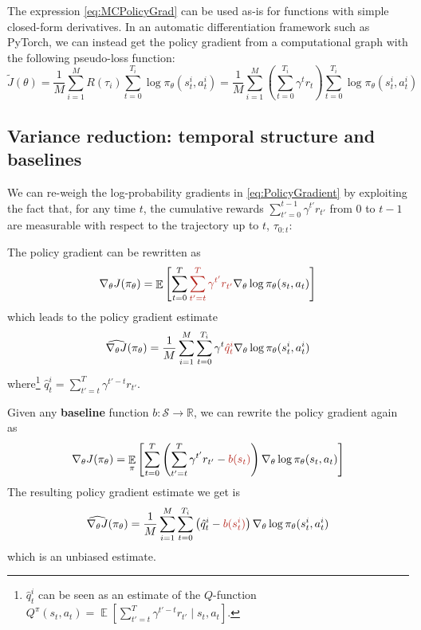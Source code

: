 \documentclass[12pt]{report}
\newcommand\RR{\mathbb{R}}
\DeclareMathOperator{\EE}{\mathbb{E}}
\newcommand{\calS}{\mathcal{S}}
\newcommand{\redfont}{\color{darkred}}
\newcommand{\bluefont}{\color{Blue}}
\begin{document}
\begin{remark}\label{rmk:PolicyGradPseudoLoss} The expression \eqref{eq:MCPolicyGrad} can be used as-is for functions with simple closed-form derivatives.
In an automatic differentiation framework such as {\normalfont\sffamily PyTorch}, we can instead get the policy gradient from a computational graph with the following pseudo-loss function:
\begin{equation}\label{eq:PolicyGradPseudoLoss}
	\tilde{J}(\theta) =
	\frac{1}{M}\sum_{i=1}^M R(\tau_i)
	\sum_{t=0}^{T_i} \log\pi_\theta(s_t^i, a_t^i) =
	\frac{1}{M}\sum_{i=1}^M
	\left(
		\sum_{t=0}^{T_i} \gamma^t r_{t}
	\right)
	\sum_{t=0}^{T_i} \log\pi_\theta(s_t^i, a_t^i)
\end{equation}
\end{remark}


\subsection{Variance reduction: temporal structure and baselines}

We can re-weigh the log-probability gradients in \cref{eq:PolicyGradient} by exploiting the fact that, for any time $t$, the cumulative rewards $\sum_{t'=0}^{t-1} \gamma^{t'} r_{t'}$ from $0$ to $t-1$ are measurable with respect to the trajectory up to $t$, $\tau_{0:t}$:
\begin{prop}
The policy gradient can be rewritten as
\begin{equation}
\nabla_\theta J(\pi_\theta) =
\EE\left[
	\sum_{t=0}^T
	{\redfont
		\sum_{t'=t}^T \gamma^{t'} r_{t'}
	}
	\nabla_\theta \log\pi_\theta(s_t,a_t)
\right]
\end{equation}
which leads to the policy gradient estimate
\begin{equation}
	\widehat{\nabla_\theta J}(\pi_\theta) =
	\frac{1}{M}\sum_{i=1}^M
	\sum_{t=0}^{T_i} \gamma^t
	{\redfont\hat{q}^i_t}
	\nabla_\theta \log\pi_\theta (s_t^i, a_t^i)
\end{equation}
where\footnote{$\hat{q}^i_t$ can be seen as an estimate of the $Q$-function $Q^\pi(s_t, a_t) = \EE[\sum_{t'=t}^T \gamma^{t'-t} r_{t'} \mid s_{t}, a_{t} ]$.} $\hat{q}^i_t = \sum_{t'=t}^T \gamma^{t'-t}r_{t'}$.
\end{prop}


Given any \textbf{\bluefont baseline} function $b\colon \calS \to \RR$, we can rewrite the policy gradient again as
\begin{equation}
	\nabla_\theta J(\pi_\theta) =
	\EE_\pi \left[
	\sum_{t=0}^T
	\left(
		\sum_{t'=t}^T \gamma^{t'} r_{t'} - {\redfont b(s_t)}
	\right)
	\nabla_\theta \log\pi_\theta(s_t, a_t)
	\right]
\end{equation}
The resulting policy gradient estimate we get is
\begin{equation}\label{eq:MCPolicyGradBaseline}
	\widehat{\nabla_\theta J}(\pi_\theta) =
	\frac{1}{M}\sum_{i=1}^M
	\sum_{t=0}^{T_i}
	\left(
		\hat{q}^i_t - {\redfont b(s^i_t)}
	\right)
	\nabla_\theta \log\pi_\theta (s_t^i, a_t^i)
\end{equation}
which is an unbiased estimate.
\end{document}
